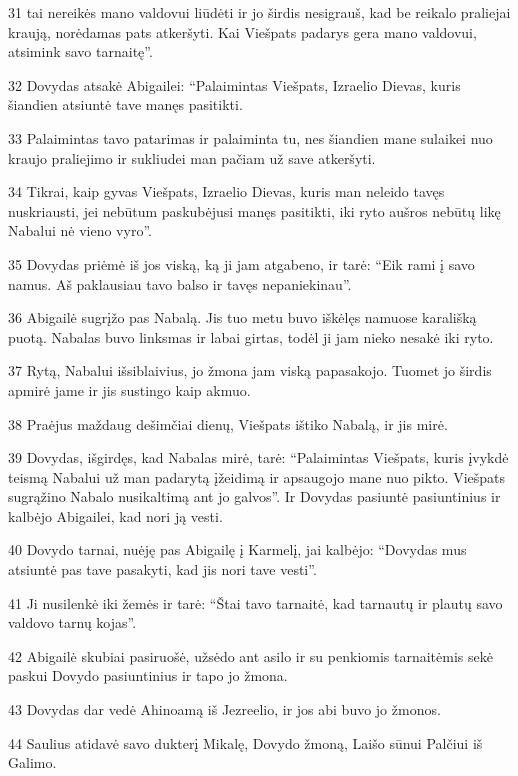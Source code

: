 \par 31 tai nereikės mano valdovui liūdėti ir jo širdis nesigrauš, kad be reikalo praliejai kraują, norėdamas pats atkeršyti. Kai Viešpats padarys gera mano valdovui, atsimink savo tarnaitę”. 
\par 32 Dovydas atsakė Abigailei: “Palaimintas Viešpats, Izraelio Dievas, kuris šiandien atsiuntė tave manęs pasitikti. 
\par 33 Palaimintas tavo patarimas ir palaiminta tu, nes šiandien mane sulaikei nuo kraujo praliejimo ir sukliudei man pačiam už save atkeršyti. 
\par 34 Tikrai, kaip gyvas Viešpats, Izraelio Dievas, kuris man neleido tavęs nuskriausti, jei nebūtum paskubėjusi manęs pasitikti, iki ryto aušros nebūtų likę Nabalui nė vieno vyro”. 
\par 35 Dovydas priėmė iš jos viską, ką ji jam atgabeno, ir tarė: “Eik rami į savo namus. Aš paklausiau tavo balso ir tavęs nepaniekinau”. 
\par 36 Abigailė sugrįžo pas Nabalą. Jis tuo metu buvo iškėlęs namuose karališką puotą. Nabalas buvo linksmas ir labai girtas, todėl ji jam nieko nesakė iki ryto. 
\par 37 Rytą, Nabalui išsiblaivius, jo žmona jam viską papasakojo. Tuomet jo širdis apmirė jame ir jis sustingo kaip akmuo. 
\par 38 Praėjus maždaug dešimčiai dienų, Viešpats ištiko Nabalą, ir jis mirė. 
\par 39 Dovydas, išgirdęs, kad Nabalas mirė, tarė: “Palaimintas Viešpats, kuris įvykdė teismą Nabalui už man padarytą įžeidimą ir apsaugojo mane nuo pikto. Viešpats sugrąžino Nabalo nusikaltimą ant jo galvos”. Ir Dovydas pasiuntė pasiuntinius ir kalbėjo Abigailei, kad nori ją vesti. 
\par 40 Dovydo tarnai, nuėję pas Abigailę į Karmelį, jai kalbėjo: “Dovydas mus atsiuntė pas tave pasakyti, kad jis nori tave vesti”. 
\par 41 Ji nusilenkė iki žemės ir tarė: “Štai tavo tarnaitė, kad tarnautų ir plautų savo valdovo tarnų kojas”. 
\par 42 Abigailė skubiai pasiruošė, užsėdo ant asilo ir su penkiomis tarnaitėmis sekė paskui Dovydo pasiuntinius ir tapo jo žmona. 
\par 43 Dovydas dar vedė Ahinoamą iš Jezreelio, ir jos abi buvo jo žmonos. 
\par 44 Saulius atidavė savo dukterį Mikalę, Dovydo žmoną, Laišo sūnui Palčiui iš Galimo.



